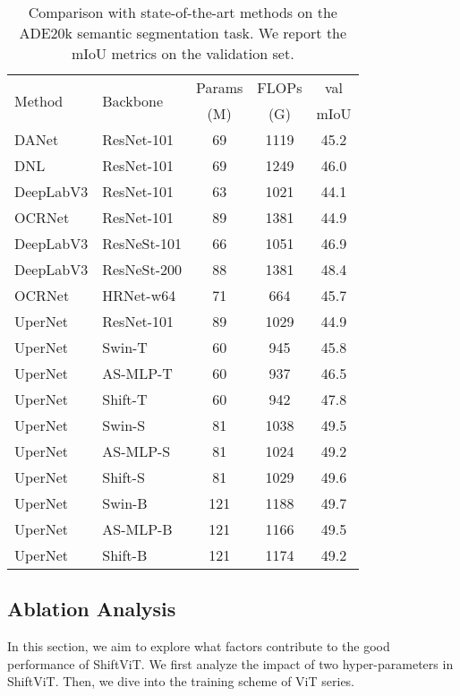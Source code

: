 \documentclass[letterpaper]{article} \usepackage{aaai22}  \usepackage{times}  \usepackage{helvet}  \usepackage{courier}  \usepackage[hyphens]{url}  \usepackage{graphicx} \usepackage{amsmath}
\begin{document}
\begin{table}[]
\centering
\caption{Comparison with state-of-the-art methods on the ADE20k semantic segmentation task. We report the mIoU metrics on the validation set.}
\label{table:segmentation}
\begin{tabular}{l|l|cc|c}
\toprule
\multirow{2}{*}{Method} & \multirow{2}{*}{Backbone}  & Params & FLOPs & val \\ 
& & (M) & (G) & mIoU \\ \midrule

DANet & ResNet-101 & 69 & 1119 & 45.2 \\ 
DNL & ResNet-101 & 69 & 1249 & 46.0 \\
DeepLabV3 & ResNet-101 & 63 & 1021 & 44.1 \\
OCRNet & ResNet-101 & 89 & 1381 & 44.9 \\
DeepLabV3 & ResNeSt-101 & 66 & 1051 & 46.9 \\
DeepLabV3 & ResNeSt-200 & 88 & 1381 & 48.4 \\
OCRNet & HRNet-w64 & 71 & 664 & 45.7 \\ \midrule
UperNet & ResNet-101 & 89 & 1029 & 44.9 \\
UperNet & Swin-T & 60 & 945 & 45.8 \\
UperNet & AS-MLP-T & 60 & 937 & 46.5 \\
\rowcolor{Bg} UperNet & Shift-T & 60 & 942 & 47.8\\ \midrule
UperNet & Swin-S & 81 & 1038 & 49.5 \\
UperNet & AS-MLP-S & 81 & 1024 & 49.2 \\
\rowcolor{Bg} UperNet & Shift-S & 81 & 1029 & 49.6\\ \midrule
UperNet & Swin-B & 121 & 1188 & 49.7 \\
UperNet & AS-MLP-B & 121 & 1166 & 49.5 \\
\rowcolor{Bg} UperNet & Shift-B & 121 & 1174 & 49.2 \\
\bottomrule

\end{tabular}
\end{table}


\subsection{Ablation Analysis}

In this section, we aim to explore what factors contribute to the good performance of ShiftViT. We first analyze the impact of two hyper-parameters in ShiftViT. Then, we dive into the training scheme of ViT series.
\end{document}
